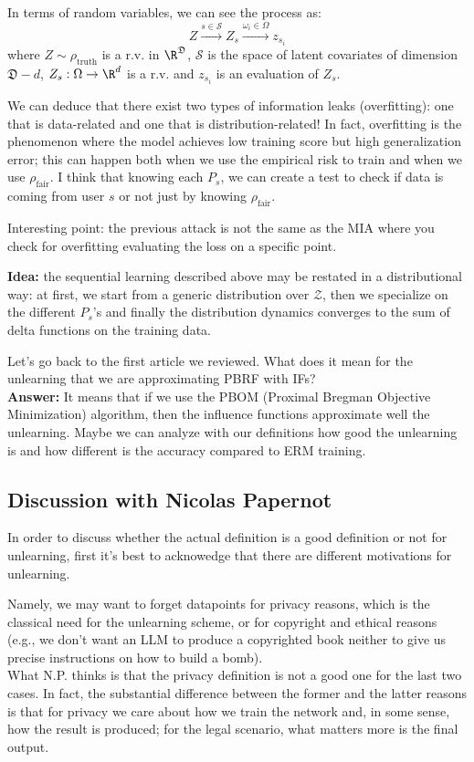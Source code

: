 In terms of random variables, we can see the process as:
$$ Z \xrightarrow{s\in\mathcal{S}} Z_s \xrightarrow{\omega_i\in\Omega} z_{s_i}$$
where $Z\sim\rho_{\mathrm{truth}}$ is a r.v. in $\R^\mathfrak{D}$, $\mathcal{S}$ is the space of latent covariates of dimension $\mathfrak{D}-d$, $Z_s:\Omega\to\R^d$ is a r.v. and $z_{s_i}$ is an evaluation of $Z_s$.

We can deduce that there exist two types of information leaks (overfitting): one that is data-related and one that is distribution-related!
In fact, overfitting is the phenomenon where the model achieves low training score but high generalization error; this can happen both when we use the empirical risk to train and when we use $\rho_{\text{fair}}$.
I think that knowing each $P_s$, we can create a test to check if data is coming from user $s$ or not just by knowing $\rho_{\text{fair}}$.

Interesting point: the previous attack is not the same as the MIA where you check for overfitting evaluating the loss on a specific point.

\textbf{Idea:} the sequential learning described above may be restated in a distributional way: at first, we start from a generic distribution over $\mathcal{Z}$, then we specialize on the different $P_s$'s and finally the distribution dynamics converges to the sum of delta functions on the training data.

{\color{RoyalBlue}
\vspace{0.3cm}
\qst Let's go back to the first article we reviewed.
What does it mean for the unlearning that we are approximating PBRF with IFs?\\
\textbf{Answer:} It means that if we use the PBOM (Proximal Bregman Objective Minimization) algorithm, then the influence functions approximate well the unlearning.
Maybe we can analyze with our definitions how good the unlearning is and how different is the accuracy compared to ERM training.
}
\subsection*{Discussion with Nicolas Papernot}
In order to discuss whether the actual definition is a good definition or not for unlearning, first it's best to acknowedge that there are different motivations for unlearning.

Namely, we may want to forget datapoints for privacy reasons, which is the classical need for the unlearning scheme, or for copyright and ethical reasons (e.g., we don't want an LLM to produce a copyrighted book neither to give us precise instructions on how to build a bomb).\\
What N.P. thinks is that the privacy definition is not a good one for the last two cases.
In fact, the substantial difference between the former and the latter reasons is that for privacy we care about how we train the network and, in some sense, how the result is produced; for the legal scenario, what matters more is the final output.

